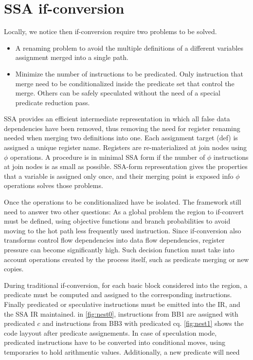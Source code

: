 \section{SSA if-conversion}

Locally, we notice then if-conversion require two problems to be solved.
\begin{itemize}
\item A renaming problem to avoid the multiple definitions of a different variables assignment merged into a single path. 
\item Minimize the number of instructions to be predicated. Only instruction that merge need to be conditionalized inside the predicate set that control the merge. Others can be safely speculated without the need of a special predicate reduction pass. 
\end {itemize}

SSA \cite{BriggsSSA} provides an efficient intermediate representation in which all false data dependencies have been removed, thus removing the need for register renaming needed when merging two definitions into one. Each assignment target (def) is assigned a unique register name. Registers are re-materialized at join nodes using $\phi$ operations. A procedure is in minimal SSA form if the number of $\phi$ instructions at join nodes is as small as possible. SSA-form representation gives the properties that a variable is assigned only once, and their merging point is exposed info $\phi$ operations solves those problems. 

Once the operations to be conditionalized have be isolated. The framework still need to answer two other questions: As a global problem the region to if-convert must be defined, using objective functions and branch probabilities to avoid moving to the hot path less frequently used instruction. Since if-conversion also transforms control flow dependencies into data flow dependencies, register pressure can become significantly high. Such decision function must take into account operations created by the process itself, such as predicate merging or new copies. 

During traditional if-conversion, for each basic block considered into the region, a predicate must be computed and assigned to the corresponding instructions. Finally predicated or speculative instructions must be emitted into the IR, and the SSA IR maintained. in \ref{fig:nest0}, instructions from BB1 are assigned with predicated $c$ and instructions from BB3 with predicated cq. \ref{fig:nest1} shows the code layyout after predicate assignements. In case of speculation mode, predicated instructions have to be converted into conditional moves, using temporaries to hold arithmentic values. Additionally, a new predicate will need 

